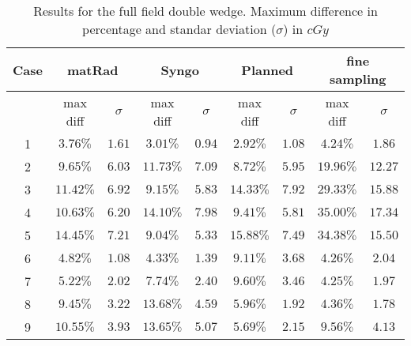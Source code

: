 \documentclass[12pt, a4paper, twoside]{book}
\begin{document}
\begin{table}[t]
\centering
\begin{tabular}{ccccccccc}
\toprule
Case & \multicolumn{2}{c}{matRad} & \multicolumn{2}{c}{Syngo} & \multicolumn{2}{c}{Planned} & \multicolumn{2}{c}{fine sampling}\\
\midrule
 & max diff & $\sigma$ & max diff & $\sigma$ & max diff & $\sigma$ & max diff & $\sigma$  \\
\midrule
1 & $3.76\%$ & $1.61$ & $3.01\%$ & $0.94$ & $2.92\%$ & $1.08$ & $4.24\%$ & $1.86$\\
2 & $9.65\%$ & $6.03$ & $11.73\%$ & $7.09$ & $8.72\%$ & $5.95$ & $19.96\%$ & $12.27$\\
3 & $11.42\%$ & $6.92$ & $9.15\%$ & $5.83$ & $14.33\%$ & $7.92$ & $29.33\%$ & $15.88$\\
4 & $10.63\%$ & $6.20$ & $14.10\%$ & $7.98$ & $9.41\%$ & $5.81$ & $35.00\%$ & $17.34$\\
5 & $14.45\%$ & $7.21$ & $9.04\%$ & $5.33$ & $15.88\%$ & $7.49$ & $34.38\%$ & $15.50$\\
6 & $4.82\%$ & $1.08$ & $4.33\%$ & $1.39$ & $9.11\%$ & $3.68$ & $4.26\%$ & $2.04$\\
7 & $5.22\%$ & $2.02$ & $7.74\%$ & $2.40$ & $9.60\%$ & $3.46$ & $4.25\%$ & $1.97$\\
8 & $9.45\%$ & $3.22$ & $13.68\%$ & $4.59$ & $5.96\%$ & $1.92$ & $4.36\%$ & $1.78$\\
9 & $10.55\%$ & $3.93$ & $13.65\%$ & $5.07$ & $5.69\%$ & $2.15$ & $9.56\%$ & $4.13$\\
\bottomrule
\end{tabular}
\caption{Results for the full field double wedge. Maximum difference in percentage and standar deviation ($\sigma$) in $cGy$}
\label{tab:FFDW}
\end{table}
\end{document}
